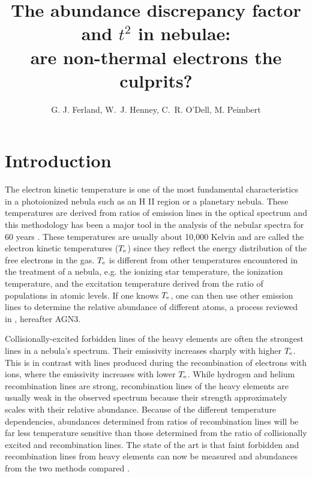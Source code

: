 \documentclass[debug, preprint, twocolumn]{rmaa}
\title{\boldmath The abundance discrepancy factor and \MakeLowercase{$t^2$} in nebulae: \\
are non-thermal electrons the culprits?}
\author{
G. J. Ferland\altaffilmark{1}, 
W.~J. Henney\altaffilmark{2},
C.~R. O'Dell\altaffilmark{3},
M. Peimbert\altaffilmark{4}
}
\begin{document}
\maketitle
\clearpage

\section{Introduction}

The electron kinetic temperature is one of the most fundamental characteristics in a photoionized
nebula such as an H II region or a planetary nebula. 
These temperatures are derived from ratios of emission lines in the optical spectrum 
and this methodology has been  
a major tool in the analysis of the nebular spectra for 60 years
\citep{2002RMxAC..12....1O}.
These temperatures are usually about 10,000 Kelvin and are called the
electron kinetic temperatures ($T\rm_{e}$) since they reflect the energy distribution of the free electrons in the gas.
$T\rm_{e}$ is different from other temperatures encountered in the treatment of a nebula,
e.g. the ionizing star temperature, the ionization temperature, and the excitation temperature 
derived from the ratio of populations in atomic levels.
If one knows $T\rm_{e}$, one can then use other emission lines to determine
the relative abundance of different atoms, a process reviewed in \citet{AGN3}, hereafter AGN3.

Collisionally-excited forbidden lines of the heavy elements are often  the strongest lines in a nebula's spectrum.
Their emissivity increases sharply with higher $T\rm_{e}$. This is in contrast with lines produced during the recombination of electrons with ions, where the emissivity increases with lower $T\rm_{e}$.
While hydrogen and helium recombination lines are strong, 
recombination lines of the heavy elements are usually weak in the observed spectrum because their strength approximately scales with their relative abundance. 
Because of the different temperature dependencies, abundances determined from ratios of
recombination lines will be far less temperature sensitive than those determined from the 
ratio of collisionally excited and recombination lines.
The state of the art is that  faint forbidden and recombination lines from heavy elements can now be measured 
and abundances from the two methods compared
\citep{2003ApJ...584..735P,2004MNRAS.355..229E}.
\end{document}

